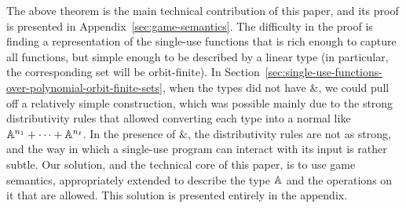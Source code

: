 The above theorem is the main technical contribution of this paper, and its proof is presented in Appendix~\ref{sec:game-semantics}. The difficulty in the proof is finding a representation of the single-use  functions that is rich enough to capture all functions, but simple enough to be described by a linear type (in particular, the corresponding set will be orbit-finite). In  Section~\ref{sec:single-use-functions-over-polynomial-orbit-finite-sets}, when the types did not have $\&$, we could pull off a relatively simple construction, which was possible mainly due to the strong distributivity rules that allowed converting each type into a normal like $\mathbb A^{n_1} + \cdots + \mathbb A^{n_\ell}$. In the presence of $\&$, the distributivity rules are not as strong, and the way in which a single-use program can interact with its input is rather subtle. 
Our solution, and the technical core of this paper, is to use game semantics, appropriately extended to describe the type $\mathbb A$ and the operations on it that are allowed. This solution is presented entirely in the appendix.









